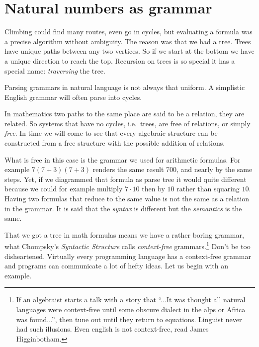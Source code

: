 \section{Natural numbers as grammar}
Climbing could find many routes, even go in cycles, but 
evaluating a formula was a precise algorithm without ambiguity.
The reason was that we had a tree.  Trees have unique paths between 
any two vertices. So if we start at the bottom we have a unique direction to 
reach the top.  Recursion on trees is so special it has a special name:
\emph{traversing} the tree.  

Parsing grammars in natural language is not always that
uniform.  A simplistic English grammar will often parse into cycles.
\begin{center}
\end{center}
In mathematics two paths to the same place are said to be a relation, 
they are related.  So systems that have no cycles, i.e.\ trees, are 
free of relations, or simply \emph{free}.  In time we will come to see 
that every algebraic structure can be constructed from a free 
structure with the possible addition of relations.

\begin{remark}
What is free in this case 
is the grammar we used for arithmetic formulas.  
For example $7(7+3)(7+3)$ renders the same result 700, and nearly 
by the same steps.  Yet, if we diagrammed that formula as 
parse tree it would quite different because we could for example 
multiply $7\cdot 10$ then by $10$ rather than squaring $10$.
Having two formulas that reduce to the same value is not the same 
as a relation in the grammar.  It is said that the \emph{syntax} is 
different but the \emph{semantics} is the same.
\end{remark}

That we got a tree in math formulas means we have a rather boring grammar, 
what Chompsky's \emph{Syntactic Structure} calls
\emph{context-free} grammars.\footnote{
    If an algebraist starts a talk with a story that ``...It was thought  all natural 
    languages were context-free until some obscure dialect in the alps or Africa was found...'', 
    then tune out until they return to equations.  
    Linguist never had such illusions. Even english is not context-free, read  James Higginbotham.} 
Don't be too disheartened.  Virtually every programming language has a 
context-free grammar and programs can communicate a lot of hefty ideas. 
Let us begin with an example.

